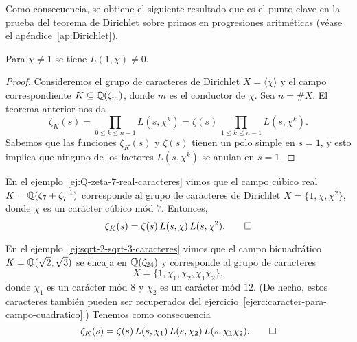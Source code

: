 Como consecuencia, se obtiene el siguiente resultado que es el punto clave en
la prueba del teorema de Dirichlet sobre primos en progresiones aritméticas
(véase el apéndice~\ref{ap:Dirichlet}).

\begin{corolario}
  \label{cor:L(1,chi)-ne-0}
  Para $\chi \ne 1$ se tiene $L (1,\chi) \ne 0$.

  \begin{proof}
    Consideremos el grupo de caracteres de Dirichlet $X = \langle\chi\rangle$
    y el campo correspondiente $K \subseteq \mathbb{Q} (\zeta_m)$, donde $m$ es
    el conductor de $\chi$. Sea $n = \# X$. El teorema anterior nos da
    \[ \zeta_K (s) = \prod_{0 \le k \le n-1} L (s,\chi^k) =
       \zeta (s) \, \prod_{1 \le k \le n-1} L (s,\chi^k). \]
    Sabemos que las funciones $\zeta_K (s)$ y $\zeta (s)$ tienen un polo simple
    en $s = 1$, y esto implica que ninguno de los factores $L (s,\chi^k)$
    se anulan en $s = 1$.
  \end{proof}
\end{corolario}

\begin{ejemplo}
  \label{ej:Q-zeta-7-real-zeta-descomp}
  En el ejemplo~\ref{ej:Q-zeta-7-real-caracteres} vimos que el campo cúbico real
  $K = \mathbb{Q} (\zeta_7 + \zeta_7^{-1})$ corresponde al grupo de caracteres de
  Dirichlet $X = \{ 1, \chi, \chi^2 \}$, donde $\chi$ es un carácter
  cúbico mód $7$. Entonces,
  \[ \zeta_K (s) = \zeta (s) \, L (s,\chi) \, L (s,\chi^2). \qedhere \]
\end{ejemplo}

\begin{ejemplo}
  \label{ej:sqrt-2-sqrt-3-zeta-descomp}
  En el ejemplo~\ref{ej:sqrt-2-sqrt-3-caracteres} vimos que el campo
  bicuadrático $K = \mathbb{Q} (\sqrt{2},\sqrt{3})$ se encaja en $\mathbb{Q} (\zeta_{24})$
  y corresponde al grupo de caracteres
  $$X = \{ 1, \chi_1, \chi_2, \chi_1\chi_2 \},$$
  donde $\chi_1$ es un carácter mód $8$ y $\chi_2$ es un carácter mód $12$.
  (De hecho, estos caracteres también pueden ser recuperados del
  ejercicio~\ref{ejerc:caracter-para-campo-cuadratico}.)
  Tenemos como consecuencia
  \[ \zeta_K (s) = \zeta (s)\,L (s,\chi_1)\,L (s,\chi_2)\,L (s,\chi_1\chi_2). \qedhere \]
\end{ejemplo}

